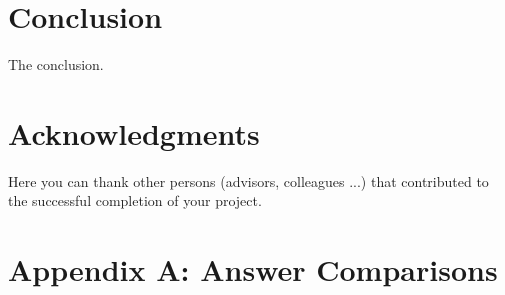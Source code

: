 \documentclass[fleqn,moreauthors,10pt]{ds_report}
\begin{document}

\section*{Conclusion}
The conclusion.


\section*{Acknowledgments}

Here you can thank other persons (advisors, colleagues ...) that contributed to the successful completion of your project.






\clearpage


\appendix
\appendix
\section*{Appendix A: Answer Comparisons}
\end{document}
